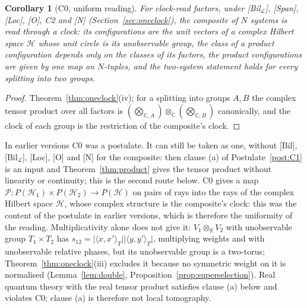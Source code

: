 \documentclass[aps,pra,onecolumn,superscriptaddress,nofootinbib,10pt]{revtex4-2}
\newtheorem{corollary}[theorem]{Corollary}
\theoremstyle{definition}
\theoremstyle{remark}
\newcommand{\R}{\mathbb{R}}
\newcommand{\C}{\mathbb{C}}
\newcommand{\cL}{\mathcal{L}}
\newcommand{\ip}[2]{\langle #1,#2\rangle}
\begin{document}
\begin{corollary}[C0, uniform reading]\label{post:C0}
For clock-read factors, under [Bil$_\cL$], [Span], [Loc], [O], C2 and [N] (Section~\ref{sec:oneclock}), the composite of $N$ systems is read
through a clock: its configurations are the unit vectors of a complex Hilbert space $\mathcal H$ whose unit
circle is its unobservable group, the class of a product configuration depends only on the classes of
its factors, the product configurations are given by one map on $N$-tuples, and the two-system
statement holds for every splitting into two groups.
\end{corollary}
\begin{proof}
Theorem~\ref{thm:oneclock}(iv); for a splitting into groups $A,B$ the complex tensor product over all
factors is $(\bigotimes_{\C,A})\otimes_\C(\bigotimes_{\C,B})$ canonically, and the clock of each group is the restriction
of the composite's clock.
\end{proof}
In earlier versions C0 was a postulate.  It can still be taken as one, without [Bil], [Bil$_\cL$], [Loc], [O] and [N] for the composite:
then clause (a) of Postulate~\ref{post:C1} is an input and Theorem~\ref{thm:product} gives the tensor
product without linearity or continuity; this is the second route below.  C0 gives a map $\mathcal P\colon P(\mathcal H_1)\times P(\mathcal H_2)\to P(\mathcal H)$ on pairs of rays into
the rays of the complex Hilbert space $\mathcal H$, whose complex structure is the composite's clock: this
was the content of the postulate in earlier versions, which is therefore the uniformity of the
reading.  Multiplicativity alone does not give it: $V_1\otimes_\R V_2$ with unobservable group $T_1\times T_2$ has
$s_{12}=\lvert\ip{x}{x'}_T\rvert\lvert\ip{y}{y'}_T\rvert$, multiplying weights and with unobservable relative phases, but its
unobservable group is a two-torus; Theorem~\ref{thm:oneclock}(iii) excludes it because no symmetric weight on it is normalised
(Lemma~\ref{lem:double}, Proposition~\ref{prop:superselection}).  Real
quantum theory with the real tensor product satisfies clause (a) below and violates C0; clause (a) is
therefore not local tomography.

\setcounter{postulate}{0}
\end{document}
